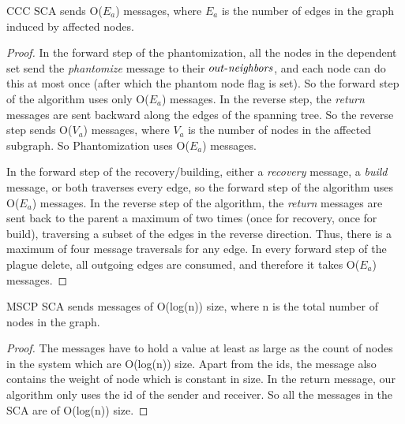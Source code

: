 \begin{replemma}{CCC}
SCA sends O($E_{a}$) messages, where $E_{a}$ is the number of edges
in the graph induced by affected nodes.
\end{replemma}
\begin{proof}

In the forward step of the phantomization, all the nodes in the dependent set send the
\emph{phantomize} message to their $\mathop{\mbox{$out$-$\mathit{neighbors}$}}$, and each node can do this at most
once (after which the phantom node flag is set).
So the forward step of the algorithm uses only
O($E_{a}$) messages. In the reverse step, the \emph{return} messages are sent
backward along the edges of the spanning tree. So the reverse step sends O($V_{a}$)
messages, where $V_{a}$ is the number of nodes in the affected subgraph.
So Phantomization uses O($E_{a}$) messages.

In the forward step of the recovery/building, either a {\em recovery} message, a {\em build} message,
or both
traverses every edge, so the forward step of the algorithm uses O($E_{a}$) messages.
In the
reverse step of the algorithm, the \emph{return} messages are sent back to the parent a maximum
of two times (once for recovery, once for build), traversing a subset of the edges in the
reverse direction. Thus, there is a maximum of four message traversals for any edge.
In every forward step of the plague delete, all outgoing edges are consumed, and therefore it 
takes O($E_a$) messages.
\end{proof}

\begin{replemma}{MSCP}
SCA sends messages of O(log(n)) size, where n is the total number of nodes
in the graph.
\end{replemma}
\begin{proof}
The messages have to hold a value at least as large as the count of nodes in the system
which are O(log(n)) size. Apart from the ids, the message also contains the weight of
node which is constant in size. In the return message, our algorithm only uses the id
of the sender and receiver. So all the messages in the SCA are of
O(log(n)) size.
\end{proof}

